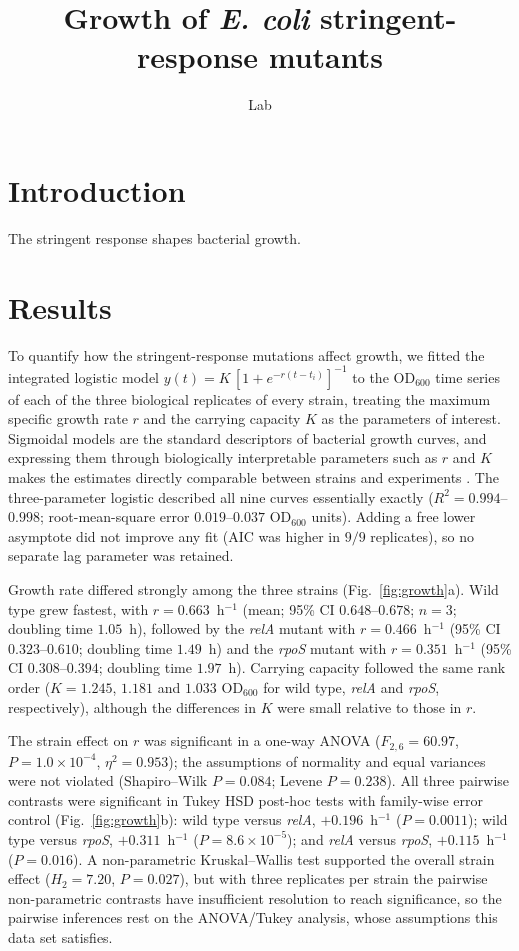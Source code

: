 \documentclass{article}
\title{Growth of \textit{E. coli} stringent-response mutants}
\author{Lab}
\begin{document}
\maketitle
\section{Introduction}
The stringent response shapes bacterial growth.
\section{Results}

To quantify how the stringent-response mutations affect growth, we fitted the
integrated logistic model $y(t) = K\,[1 + e^{-r(t-t_{i})}]^{-1}$ to the
OD$_{600}$ time series of each of the three biological replicates of every
strain, treating the maximum specific growth rate $r$ and the carrying capacity
$K$ as the parameters of interest. Sigmoidal models are the standard
descriptors of bacterial growth curves, and expressing them through
biologically interpretable parameters such as $r$ and $K$ makes the estimates
directly comparable between strains and experiments
\cite{monod1949growth,zwietering1990modeling,baranyi1994dynamic}. The
three-parameter logistic described all nine curves essentially exactly
($R^{2} = 0.994$--$0.998$; root-mean-square error $0.019$--$0.037$ OD$_{600}$
units). Adding a free lower asymptote did not improve any fit (AIC was higher
in $9/9$ replicates), so no separate lag parameter was retained.

Growth rate differed strongly among the three strains
(Fig.~\ref{fig:growth}a). Wild type grew fastest, with
$r = 0.663$~h$^{-1}$ (mean; 95\% CI $0.648$--$0.678$; $n = 3$; doubling time
$1.05$~h), followed by the \textit{relA} mutant with
$r = 0.466$~h$^{-1}$ (95\% CI $0.323$--$0.610$; doubling time $1.49$~h) and
the \textit{rpoS} mutant with $r = 0.351$~h$^{-1}$ (95\% CI
$0.308$--$0.394$; doubling time $1.97$~h). Carrying capacity followed the same
rank order ($K = 1.245$, $1.181$ and $1.033$ OD$_{600}$ for wild type,
\textit{relA} and \textit{rpoS}, respectively), although the differences in
$K$ were small relative to those in $r$.

The strain effect on $r$ was significant in a one-way ANOVA
($F_{2,6} = 60.97$, $P = 1.0\times10^{-4}$, $\eta^{2} = 0.953$); the
assumptions of normality and equal variances were not violated
(Shapiro--Wilk $P = 0.084$; Levene $P = 0.238$). All three pairwise contrasts
were significant in Tukey HSD post-hoc tests with family-wise error control
(Fig.~\ref{fig:growth}b): wild type versus \textit{relA},
$+0.196$~h$^{-1}$ ($P = 0.0011$); wild type versus \textit{rpoS},
$+0.311$~h$^{-1}$ ($P = 8.6\times10^{-5}$); and \textit{relA} versus
\textit{rpoS}, $+0.115$~h$^{-1}$ ($P = 0.016$). A non-parametric
Kruskal--Wallis test supported the overall strain effect
($H_{2} = 7.20$, $P = 0.027$), but with three replicates per strain the
pairwise non-parametric contrasts have insufficient resolution to reach
significance, so the pairwise inferences rest on the ANOVA/Tukey analysis,
whose assumptions this data set satisfies.
\end{document}
